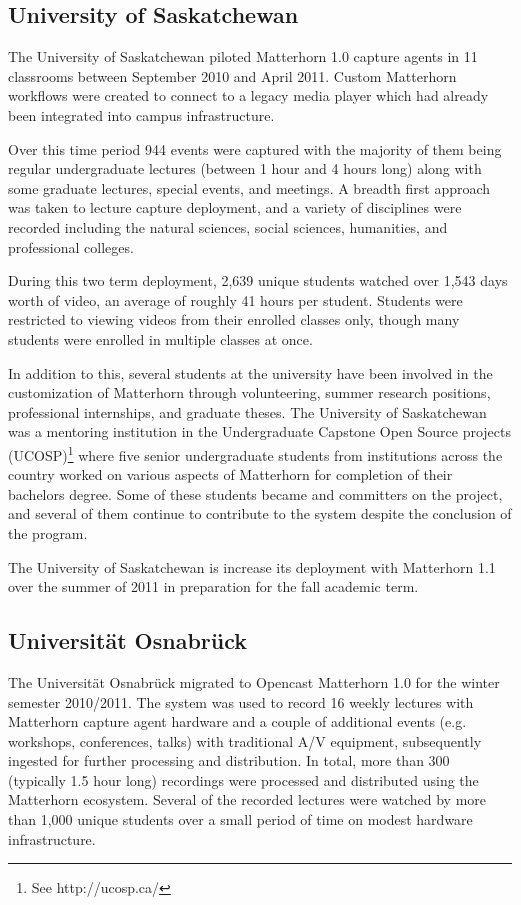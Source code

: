 \documentclass{sig-alternate}
\begin{document}
\subsection{University of Saskatchewan}
The University of Saskatchewan piloted Matterhorn 1.0 capture agents in 11 classrooms between September 2010 and April 2011.  Custom Matterhorn workflows were created to connect to a legacy media player which had already been integrated into campus infrastructure.

Over this time period 944 events were captured with the majority of them being regular undergraduate lectures (between 1 hour and 4 hours long) along with some graduate lectures, special events, and meetings.  A breadth first approach was taken to lecture capture deployment, and a variety of disciplines were recorded including the natural sciences, social sciences, humanities, and professional colleges.

During this two term deployment, 2,639 unique students watched over 1,543 days worth of video, an average of roughly 41 hours per student.  Students were restricted to viewing videos from their enrolled classes only, though many students were enrolled in multiple classes at once.

In addition to this, several students at the university have been involved in the customization of Matterhorn through volunteering, summer research positions, professional internships, and graduate theses.  The University of Saskatchewan was a mentoring institution in the Undergraduate Capstone Open Source projects (UCOSP)\footnote{See http://ucosp.ca/} where five senior undergraduate students from institutions across the country worked on various aspects of Matterhorn for completion of their bachelors degree.  Some of these students became and committers on the project, and several of them continue to contribute to the system despite the conclusion of the program.

The University of Saskatchewan is increase its deployment with Matterhorn 1.1 over the summer of 2011 in preparation for the fall academic term.

\subsection{Universit\"{a}t Osnabr\"{u}ck}
The Universit\"{a}t Osnabr\"{u}ck migrated to Opencast Matterhorn 1.0 for the winter semester 2010/2011. The system was used to record 16 weekly lectures with Matterhorn capture agent hardware and a couple of additional events (e.g. workshops, conferences, talks) with traditional A/V equipment, subsequently ingested for further processing and distribution. In total, more than 300 (typically 1.5 hour long) recordings were processed and distributed using the Matterhorn ecosystem. Several of the recorded lectures were watched by more than 1,000 unique students over a small period of time on modest hardware infrastructure.
\end{document}

